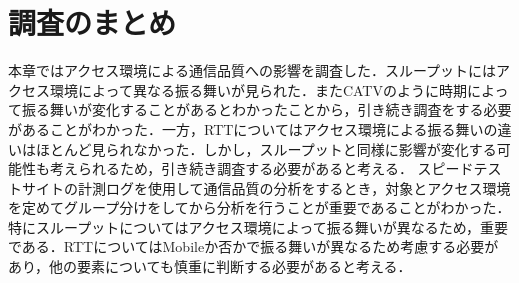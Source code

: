 \section{調査のまとめ}
本章ではアクセス環境による通信品質への影響を調査した．スループットにはアクセス環境によって異なる振る舞いが見られた．またCATVのように時期によって振る舞いが変化することがあるとわかったことから，引き続き調査をする必要があることがわかった．一方，RTTについてはアクセス環境による振る舞いの違いはほとんど見られなかった．しかし，スループットと同様に影響が変化する可能性も考えられるため，引き続き調査する必要があると考える．
スピードテストサイトの計測ログを使用して通信品質の分析をするとき，対象とアクセス環境を定めてグループ分けをしてから分析を行うことが重要であることがわかった．特にスループットについてはアクセス環境によって振る舞いが異なるため，重要である．RTTについてはMobileか否かで振る舞いが異なるため考慮する必要があり，他の要素についても慎重に判断する必要があると考える．